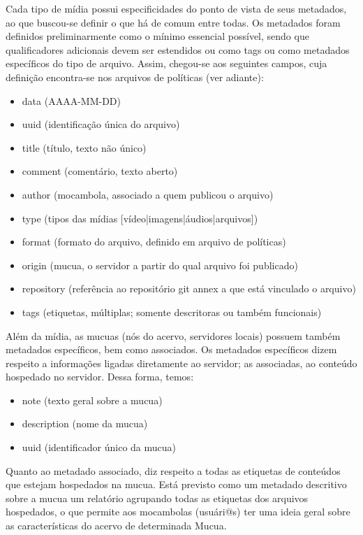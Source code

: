 Cada tipo de mídia possui especificidades do ponto de vista de seus
metadados, ao que buscou-se definir o que há de comum entre todas. Os
metadados foram definidos preliminarmente como o mínimo essencial
possível, sendo que qualificadores adicionais devem ser estendidos ou
como tags ou como metadados específicos do tipo de arquivo. Assim,
chegou-se aos seguintes campos, cuja definição encontra-se nos
arquivos de políticas (ver adiante):
\begin{itemize}
\item data (AAAA-MM-DD)
\item uuid (identificação única do arquivo)
\item title (título, texto não único)
\item comment (comentário, texto aberto)
\item author (mocambola, associado a quem publicou o arquivo)
\item type (tipos das mídias [vídeo|imagens|áudios|arquivos])
\item format (formato do arquivo, definido em arquivo de políticas)
\item origin (mucua, o servidor a partir do qual arquivo foi
  publicado)
\item repository (referência ao repositório git annex a que está vinculado o arquivo)
\item tags (etiquetas, múltiplas; somente descritoras ou também
  funcionais)
\end{itemize}

Além da mídia, as mucuas (nós do acervo, servidores locais) possuem
também metadados específicos, bem como associados. Os metadados
específicos dizem respeito a informações ligadas diretamente ao
servidor; as associadas, ao conteúdo hospedado no servidor. Dessa
forma, temos:
\begin{itemize}
\item note (texto geral sobre a mucua)
\item description (nome da mucua)
\item uuid (identificador único da mucua)
\end{itemize}


Quanto ao metadado associado, diz respeito a todas as etiquetas de
conteúdos que estejam hospedados na mucua. Está previsto como um
metadado descritivo sobre a mucua um relatório agrupando todas as
etiquetas dos arquivos hospedados, o que permite aos mocambolas
(usuári@s) ter uma ideia geral sobre as características do acervo de
determinada Mucua.

